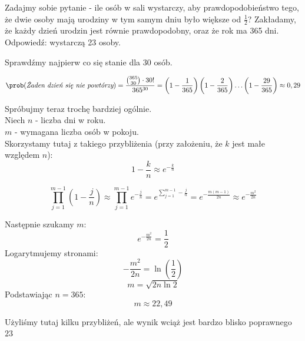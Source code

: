 Zadajmy sobie pytanie - ile osób w sali wystarczy, aby prawdopodobieństwo tego, że dwie osoby
mają urodziny w tym samym dniu było większe od \( \frac{1}{2} \)? Zakładamy, że każdy dzień urodzin jest równie prawdopodobny, oraz że rok ma 365 dni.\\
Odpowiedź: wystarczą 23 osoby.

\begin{example}
	Sprawdźmy najpierw co się stanie dla 30 osób.

	\[
		\prob(\textit{Żaden dzień się nie powtórzy}) = \frac{\binom{365}{30} \cdot 30!}{365^{30}} = \left(1 - \frac{1}{365} \right)\left( 1 - \frac{2}{365} \right)\ldots\left(1 - \frac{29}{365}\right) \approx 0,29
	\]

\end{example}

\begin{example}
	Spróbujmy teraz trochę bardziej ogólnie.\\
	Niech \( n \) - liczba dni w roku.\\
	\( m \) - wymagana liczba osób w pokoju.\\

	Skorzystamy tutaj z takiego przybliżenia (przy założeniu, że \( k \) jest małe względem \( n \)):
	\[
		1 - \frac{k}{n} \approx e^{-\frac{k}{n}}
	\]

	\[
		\prod_{j = 1}^{m - 1}\left( 1 - \frac{j}{n} \right) \approx \prod_{j = 1}^{m - 1}e^{-\frac{j}{n}} = e^{\sum_{j = 1}^{m - 1}-\frac{j}{n}} = e^{-\frac{m(m-1)}{2n}} \approx e^{-\frac{m^2}{2n}}
	\]

	Następnie szukamy \( m \):
	\[
		e^{-\frac{m^2}{2n}} = \frac{1}{2}
	\]
	Logarytmujemy stronami:
	\[
		-\frac{m^2}{2n} = \ln\left(\frac{1}{2}\right)
	\]
	\[
		m = \sqrt{2n\ln2}
	\]
	Podstawiając \( n = 365 \):
	\[
		m \approx 22,49
	\]

	Użyliśmy tutaj kilku przybliżeń, ale wynik wciąż jest bardzo blisko poprawnego \(23\)
\end{example}

